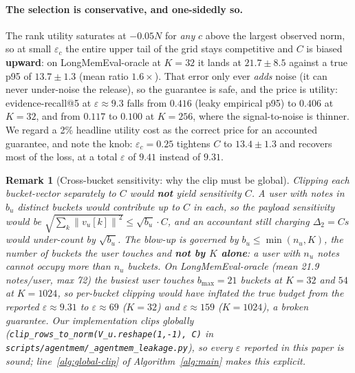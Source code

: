 \documentclass[pdflatex,sn-mathphys-num,iicol]{sn-jnl}
\theoremstyle{thmstyleone}%
\theoremstyle{thmstyletwo}%
\newtheorem{remark}{Remark}%
\theoremstyle{thmstylethree}%
\newcommand{\eps}{\varepsilon}
\newcommand{\norm}[1]{\left\lVert #1 \right\rVert}
\begin{document}
\paragraph{The selection is conservative, and one-sidedly so.} The rank utility
saturates at $-0.05 N$ for \emph{any} $c$ above the largest observed norm, so at
small $\eps_c$ the entire upper tail of the grid stays competitive and $C$ is
biased \textbf{upward}: on LongMemEval-oracle at $K = 32$ it lands at
$21.7 \pm 8.5$ against a true p95 of $13.7 \pm 1.3$ (mean ratio $1.6\times$). That
error only ever \emph{adds} noise (it can never under-noise the release), so the
guarantee is safe, and the price is utility: evidence-recall@5 at $\eps \approx 9.3$
falls from $0.416$ (leaky empirical p95) to $\mathbf{0.406}$ at $K = 32$, and from
$0.117$ to $0.100$ at $K = 256$, where the signal-to-noise is thinner. We regard a
2\% headline utility cost as the correct price for an accounted guarantee, and note
the knob: $\eps_c = 0.25$ tightens $C$ to $13.4 \pm 1.3$ and recovers most of the
loss, at a total $\eps$ of $9.41$ instead of $9.31$.

\begin{remark}[Cross-bucket sensitivity: why the clip must be global]
\label{rem:global-clip}
Clipping each bucket-vector \emph{separately} to $C$ would \textbf{not} yield
sensitivity $C$. A user with notes in $b_u$ distinct buckets would contribute up
to $C$ in each, so the payload sensitivity would be
$\sqrt{\sum_k \norm{v_u[k]}^2} \leq \sqrt{b_u} \cdot C$, and an accountant still
charging $\Delta_2 = C s$ would under-count by $\sqrt{b_u}$. The blow-up is
governed by $b_u \leq \min(n_u, K)$, the number of buckets the user \emph{touches}
and \textbf{not by $K$ alone}: a user with $n_u$ notes cannot occupy more than
$n_u$ buckets. On LongMemEval-oracle (mean 21.9 notes/user, max 72) the busiest
user touches $b_{\max} = 21$ buckets at $K = 32$ and $54$ at $K = 1024$, so
per-bucket clipping would have inflated the true budget from the reported
$\eps \approx 9.31$ to $\eps \approx 69$ ($K = 32$) and $\eps \approx 159$
($K = 1024$), a broken guarantee. Our implementation clips globally
(\texttt{clip\_rows\_to\_norm(V\_u.reshape(1,-1), C)} in
\texttt{scripts/agentmem/\_agentmem\_leakage.py}), so every $\eps$ reported in this
paper is sound; line~\ref{alg:global-clip} of Algorithm~\ref{alg:main} makes this
explicit.
\end{remark}
\end{document}
